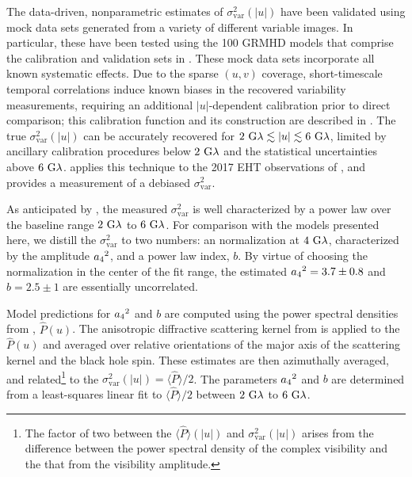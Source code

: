 The data-driven, nonparametric estimates of $\sigma_\text{var}^2 (|u|)$ have been validated using mock data sets generated from a variety of different variable images.  In particular, these have been tested using the 100 GRMHD models that comprise the calibration and validation sets in .  These mock data sets incorporate all known systematic effects.  Due to the sparse $(u,v)$ coverage, short-timescale temporal correlations induce known biases in the recovered variability measurements, requiring an additional $|u|$-dependent calibration prior to direct comparison; this calibration function and its construction are described in \citealt{NoiseModeling}.  The true $\sigma_\text{var}^2 (|u|)$ can be accurately recovered for $2~{\rm G}\lambda\lesssim|u|\lesssim6~{\rm G}\lambda$, limited by ancillary calibration procedures below $2~{\rm G}\lambda$ and the statistical uncertainties above $6~{\rm G}\lambda$.   applies this technique to the 2017 EHT observations of \sgra, and provides a measurement of a debiased $\sigma_\text{var}^2$.


As anticipated by \citet{Georgiev_2022}, the measured $\sigma_\text{var}^2$ is well characterized by a power law over the baseline range $2~{\rm G}\lambda$ to $6~{\rm G}\lambda$.  For comparison with the models presented here, we distill the $\sigma_{\text{var}}^2$ to two numbers: an normalization at $4~{\rm G}\lambda$, characterized by the amplitude ${a_4}^2$, and a power law index, $b$.  By virtue of choosing the normalization in the center of the fit range, the estimated ${a_4}^2=3.7\pm0.8$ and $b=2.5\pm1$ are essentially uncorrelated.

Model predictions for ${a_4}^2$ and $b$ are computed using the power spectral densities from \citet{Georgiev_2022}, $\hat{P}(u)$. The anisotropic diffractive scattering kernel from \citet{Johnson_2018} is applied to the $\hat{P}(u)$ and averaged over relative orientations of the major axis of the scattering kernel and the black hole spin.  These estimates are then azimuthally averaged, and related\footnote{The factor of two between the $\langle\hat{P}\rangle(|u|)$ and $\sigma_\text{var}^2(|u|)$ arises from the difference between the power spectral density of the complex visibility and the that from the visibility amplitude.} to the $\sigma_\text{var}^2(|u|)=\langle \hat{P}\rangle/2$.  The parameters ${a_4}^2$ and $b$ are determined from a least-squares linear fit to $\langle \hat{P}\rangle/2$ between $2~{\rm G}\lambda$ to $6~{\rm G}\lambda$.

